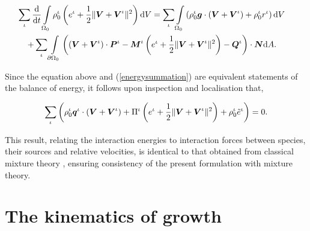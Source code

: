 \begin{eqnarray}
\sum\limits_{\iota}\frac{\mathrm{d}}{\mathrm{d}t}
\int\limits_{\Omega_0}\rho_0^\iota \left ( e^\iota + \frac{1}{2}
\Vert\mbox{\boldmath$ V$}+\mbox{\boldmath$ V$}^\iota\Vert^2 \right ) \mathrm{d}V =
\sum\limits_{\iota}\int\limits_{\Omega_0} \left(\rho_0^\iota\mbox{\boldmath$ g$}
\cdot\left(\mbox{\boldmath$ V$}+\mbox{\boldmath$ V$}^\iota\right) + \rho_0^\iota r^\iota
\right)\mathrm{d}V &
&\nonumber\\ +\sum\limits_{\iota}\int\limits_{\partial
  \Omega_0}\left(\left(\mbox{\boldmath$ V$}+\mbox{\boldmath$ V$}^\iota\right)\cdot\mbox{\boldmath$ P$}^\iota -
\mbox{\boldmath$ M$}^\iota\left(e^\iota +\frac{1}{2} \Vert\mbox{\boldmath$ V$}+\mbox{\boldmath$ V$}^\iota\Vert^2\right) -
\mbox{\boldmath$ Q$}^\iota\right)\cdot\mbox{\boldmath$ N$}\mathrm{d}A.\quad\nonumber& &
\end{eqnarray}

Since the equation above and (\ref{energysummation}) are equivalent
statements of the balance of energy, it follows upon inspection and
localisation that,

\begin{eqnarray}
\sum\limits_{\iota}\left(\rho_0^\iota\mbox{\boldmath$ q$}^\iota\cdot(\mbox{\boldmath$ V$}+\mbox{\boldmath$ V$}^\iota)
+ \Pi^\iota\left(e^\iota +
\frac{1}{2}\Vert\mbox{\boldmath$ V$}+\mbox{\boldmath$ V$}^\iota\Vert^2\right) +
\rho^\iota_0\tilde{e}^\iota\right) =
0. \label{energysummationresult}
\end{eqnarray}

This result, relating the interaction energies to interaction
forces between species, their sources and relative velocities, is
identical to that obtained from classical mixture theory
\citep{TruesdellNoll:65}, ensuring consistency of the present
formulation with mixture theory.

\section{The kinematics of growth}
\label{kinematics-of-growth}

